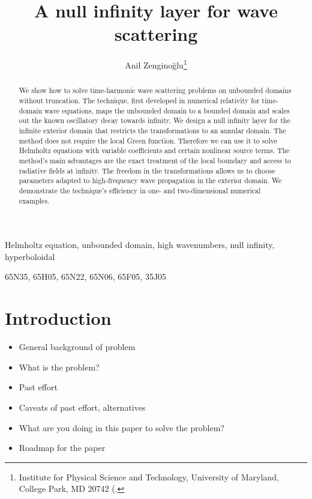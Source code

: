 \documentclass[draft,onefignum,onetabnum]{siamart190516}
\title{A null infinity layer for wave scattering}
\author{Anil Zengino\u{g}lu\thanks{Institute for Physical Science and Technology, University of Maryland, College Park, MD 20742
  (\email{anil@umd.edu)}.}}
\date{}
\begin{document}
\maketitle

\begin{abstract}
We show how to solve time-harmonic wave scattering problems on unbounded domains without truncation. The technique, first developed in numerical relativity for time-domain wave equations, maps the unbounded domain to a bounded domain and scales out the known oscillatory decay towards infinity. We design a null infinity layer for the infinite exterior domain that restricts the transformations to an annular domain. The method does not require the local Green function. Therefore we can use it to solve Helmholtz equations with variable coefficients and certain nonlinear source terms. The method's main advantages are the exact treatment of the local boundary and access to radiative fields at infinity. The freedom in the transformations allows us to choose parameters adapted to high-frequency wave propagation in the exterior domain. We demonstrate the technique's efficiency in one- and two-dimensional numerical examples.
\end{abstract}

\begin{keywords}
	Helmholtz equation, unbounded domain, high wavenumbers, null infinity, hyperboloidal
\end{keywords}

\begin{AMS}
	65N35, %
	65H05, %
	65N22, %
	65N06, %
	65F05, %
	35J05  %
\end{AMS}


\section{Introduction}

\begin{itemize}
\item General background of problem
\item What is the problem?
\item Past effort
\item Caveats of past effort, alternatives
\item What are you doing in this paper to solve the problem?
\item Roadmap for the paper
\end{itemize}
\end{document}
